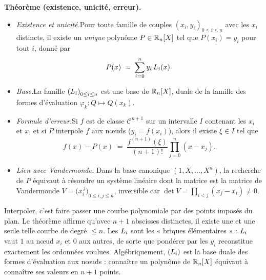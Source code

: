 \begin{tcolorbox}[thmbox]
  \medskip
  \textbf{Théorème (existence, unicité, erreur).}
  \begin{itemize}
    \item \textit{Existence et unicité.}\enspace Pour toute famille de
          couples ${(x_i, y_i)}_{0 \leq i \leq n}$ avec les $x_i$ distincts,
          il existe un \emph{unique} polynôme $P \in \mathbb{R}_n[X]$ tel que
          $P(x_i) = y_i$ pour tout $i$, donné par
          \[
            P(x) \;=\; \sum_{i=0}^{n} y_i\, L_{i}(x).
          \]
    \item \textit{Base.}\enspace La famille ${(L_{i})}_{0 \leq i \leq n}$
          est une base de $\mathbb{R}_n[X]$, duale de la famille des formes
          d'évaluation $\varphi_k : Q \mapsto Q(x_k)$.
    \item \textit{Formule d'erreur.}\enspace Si $f$ est de classe
          $\mathcal{C}^{n+1}$ sur un intervalle $I$ contenant les $x_i$ et
          $x$, et si $P$ interpole $f$ aux nœuds ($y_i = f(x_i)$), alors il
          existe $\xi \in I$ tel que
          \[
            f(x) - P(x) \;=\; \frac{f^{(n+1)}(\xi)}{(n+1)!}
            \prod_{j=0}^{n} (x - x_j).
          \]
    \item \textit{Lien avec Vandermonde.}\enspace{}
          Dans la base canonique $(1, X, \ldots, X^n)$, la recherche de $P$
          équivaut à résoudre un système linéaire dont la matrice est la
          matrice de Vandermonde $V = {\bigl(x_i^{\,j}\bigr)}_{0 \leq i,j \leq n}$,
          inversible car $\det V = \prod_{i<j}(x_j - x_i) \neq 0$.
  \end{itemize}
\end{tcolorbox}

\begin{significationintuitive}
Interpoler, c'est faire passer une courbe polynomiale par des points
imposés du plan. Le théorème affirme qu'avec $n+1$ abscisses distinctes,
il existe une et une seule telle courbe de degré $\leq n$. Les $L_{i}$
sont les « briques élémentaires » : $L_{i}$ vaut $1$ au nœud $x_i$ et
$0$ aux autres, de sorte que pondérer par les $y_i$ reconstitue exactement
les ordonnées voulues. Algébriquement, $(L_{i})$ est la base duale des
formes d'évaluation aux nœuds : connaître un polynôme de $\mathbb{R}_n[X]$ équivaut à
connaître ses valeurs en $n+1$ points.
\end{significationintuitive}

\decsep{}


